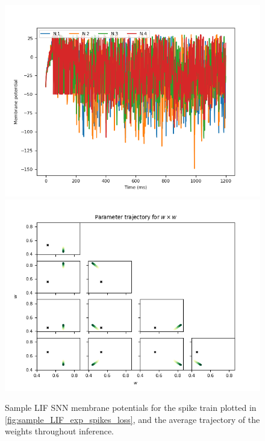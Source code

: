 \documentclass[mphil,deptreport,ianc]{infthesis} %
\begin{document}
\begin{figure}
    \centering
    \vspace{-0.1in}
    \includegraphics[width=0.8\columnwidth]{figures/samples/LIF/12-10_09-55-57-223/membrane_pots_train_i_100.png}
    \includegraphics[width=0.8\columnwidth]{figures/samples/LIF/12-10_09-55-57-223/test_weights_inference_trajectories_param_w.png}
    \vspace{-0.1in}
    \caption{Sample LIF SNN membrane potentials for the spike train plotted in \ref{fig:sample_LIF_exp_spikes_loss}, and the average trajectory of the weights throughout inference.}
    \label{fig:sample_LIF_exp_vs_traject}
\end{figure}

\end{document}
